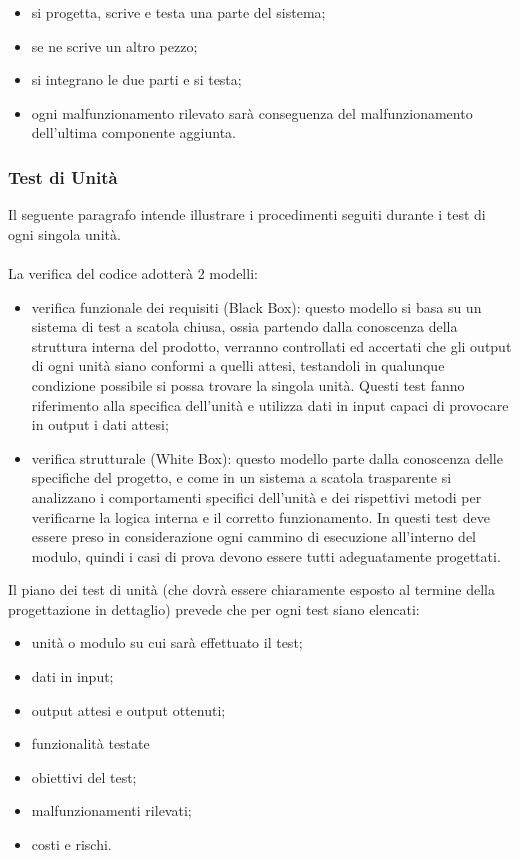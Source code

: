 \begin{itemize}
  \item si progetta, scrive e testa una parte del sistema;
  \item se ne scrive un altro pezzo;
  \item si integrano le due parti e si testa;
  \item ogni malfunzionamento rilevato sar\`a conseguenza del malfunzionamento
  dell'ultima componente aggiunta.
\end{itemize}


\subsubsection{Test di Unit\`a}
Il seguente paragrafo intende illustrare i procedimenti seguiti durante i test
di ogni singola unit\`a.\\ \\
La verifica del codice adotter\`a 2 modelli:

\begin{itemize}
  \item verifica funzionale dei requisiti (Black Box): questo modello si basa su
  un sistema di test a scatola chiusa, ossia partendo dalla conoscenza della struttura interna del 
prodotto, verranno controllati ed accertati che gli output di ogni unit\`a siano  conformi 
a quelli attesi, testandoli in qualunque condizione possibile si possa trovare la singola 
unit\`a. Questi test fanno riferimento alla specifica dell'unit\`a e utilizza dati in input 
capaci di provocare in output i dati attesi;
  \item verifica strutturale (White Box): questo modello parte dalla conoscenza 
  delle specifiche del progetto, e come in un sistema a scatola trasparente si analizzano i 
comportamenti specifici dell'unit\`a e dei rispettivi metodi per verificarne la logica 
interna e il corretto funzionamento. In questi test deve essere preso in considerazione 
ogni cammino di esecuzione all'interno del modulo, quindi i casi di prova devono essere 
tutti adeguatamente progettati. 
\end{itemize}


Il piano dei test di unit\`a (che dovr\`a essere chiaramente esposto al termine
della progettazione in dettaglio) prevede che per ogni test siano elencati:

\begin{itemize}
  \item unit\`a o modulo su cui sar\`a effettuato il test;
  \item dati in input;
  \item output attesi e output ottenuti;
  \item funzionalit\`a testate
  \item obiettivi del test;
  \item malfunzionamenti rilevati;
  \item costi e rischi.
\end{itemize}

